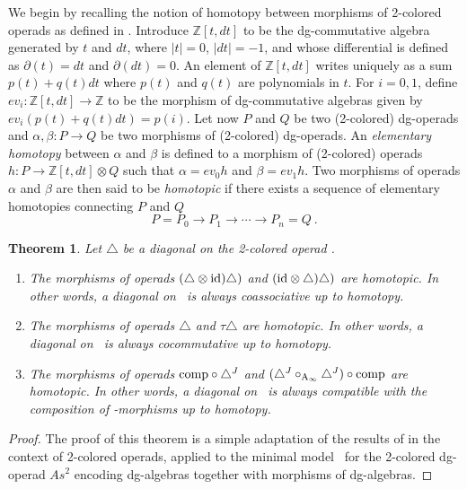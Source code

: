 \documentclass[twoside, 12pt]{amsart}
\newtheorem{theorem}{Theorem}
\theoremstyle{remark}
\begin{document}
We begin by recalling the notion of homotopy between morphisms of 2-colored operads as defined in \cite[Section 3.10]{MSS}. Introduce $\mathbb{Z}[t,dt]$ to be the dg-commutative algebra generated by $t$ and $dt$, where $|t|=0$, $|dt|=-1$, and whose differential is defined as $\partial (t) = dt$ and $\partial (dt) = 0$. An element of $\mathbb{Z}[t,dt]$ writes uniquely as a sum $p(t)+q(t)dt$ where $p(t)$ and $q(t)$ are polynomials in $t$. For $i=0,1$, define $ev_i : \mathbb{Z}[t,dt] \rightarrow \mathbb{Z}$ to be the morphism of dg-commutative algebras given by $ev_i ( p(t) + q(t)dt ) = p(i)$.
Let now $P$ and $Q$ be two (2-colored) dg-operads and $\alpha , \beta : P \rightarrow Q$ be two morphisms of (2-colored) dg-operads.
An \textit{elementary homotopy} between $\alpha$ and $\beta$ is defined to a morphism of (2-colored) operads $h : P \rightarrow \mathbb{Z}[t,dt] \otimes Q$ such that $\alpha = ev_0 h$ and $\beta = ev_1 h$.
Two morphisms of operads $\alpha$ and $\beta$ are then said to be \textit{homotopic} if there exists a sequence of elementary homotopies connecting $P$ and $Q$
\[ P = P_0 \rightarrow P_1 \rightarrow \cdots \rightarrow P_n = Q \ . \]

\begin{theorem} \label{th:homotopy-properties}
Let $\triangle$ be a diagonal on the 2-colored operad \Ainfdeux . 
\begin{enumerate}
    \item The morphisms of operads $(\triangle \otimes \mathrm{id} ) \triangle)$ and $(\mathrm{id} \otimes \triangle) \triangle)$ are homotopic. In other words, a diagonal on \Ainfdeux\ is always coassociative up to homotopy.
    \item The morphisms of operads $\triangle$ and $\tau \triangle$ are homotopic. In other words, a diagonal on \Ainfdeux\ is always cocommutative up to homotopy.
    \item The morphisms of operads $\mathrm{comp}  \circ \triangle^{J}$ and $( \triangle^{J} \circ_{\mathrm{A}_\infty} \triangle^{J} ) \circ \mathrm{comp}$ are homotopic. In other words, a diagonal on \Ainfdeux\ is always compatible with the composition of \Ainf -morphisms up to homotopy.
\end{enumerate}
\end{theorem}

\begin{proof}
The proof of this theorem is a simple adaptation of the results of \cite[Section 2]{MarklShnider06} in the context of 2-colored operads, applied to the minimal model \Ainfdeux\ for the 2-colored dg-operad $As^2$ encoding dg-algebras together with morphisms of dg-algebras.
\end{proof}
\end{document}
